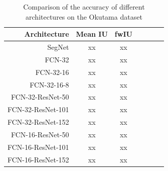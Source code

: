 \begin{appendices}
\begin{table}[htbp]
  \begin{tabular}{rcccccc}
    \rowcolor{gray!50}
    \toprule
    \textbf{Architecture} & \textbf{Mean IU} & \textbf{fwIU} \\
    \midrule
    SegNet &				xx & 		xx \\
    FCN-32 &				xx & 		xx \\
    FCN-32-16 &			xx & 		xx \\
    FCN-32-16-8 &		xx & 		xx \\
    FCN-32-ResNet-50 &	xx & 		xx \\
    FCN-32-ResNet-101 &	xx & 		xx \\
    FCN-32-ResNet-152 &	xx & 		xx \\
    FCN-16-ResNet-50 &	xx & 		xx \\
    FCN-16-ResNet-101 &	xx & 		xx \\
    FCN-16-ResNet-152 &	xx & 		xx \\
    \bottomrule
  \end{tabular}%
  
  \caption{Comparison of the accuracy of different architectures on the Okutama dataset}
  \label{appendices:setup2:_oku}
\end{table}%


\end{appendices}